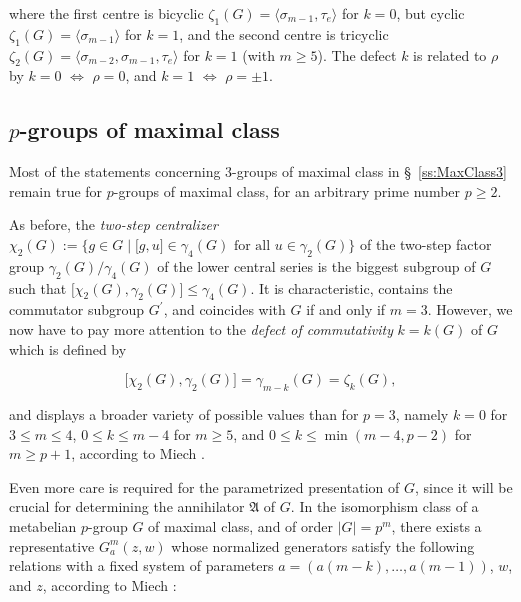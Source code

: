 \documentclass{amsart}
\theoremstyle{definition}
\numberwithin{equation}{section}
\begin{document}
\begin{itemize}
\noindent
where the first centre is bicyclic \(\zeta_1(G)=\langle\sigma_{m-1},\tau_e\rangle\) for \(k=0\),
but cyclic \(\zeta_1(G)=\langle\sigma_{m-1}\rangle\) for \(k=1\),
and the second centre is tricyclic \(\zeta_2(G)=\langle\sigma_{m-2},\sigma_{m-1},\tau_e\rangle\) for \(k=1\) (with \(m\ge 5\)).
The defect \(k\) is related to \(\rho\) by
\(k=0\) \(\Longleftrightarrow\) \(\rho=0\), and
\(k=1\) \(\Longleftrightarrow\) \(\rho=\pm 1\).

\end{itemize}



\subsection{\(p\)-groups of maximal class}
\label{ss:MaxClassP}

\noindent
Most of the statements concerning \(3\)-groups of maximal class in \S\
\ref{ss:MaxClass3}
remain true for \(p\)-groups of maximal class, 
for an arbitrary prime number \(p\ge 2\).

As before, the \textit{two-step centralizer}
\(\chi_2(G):=\lbrace g\in G\mid\lbrack g,u\rbrack\in\gamma_4(G)\text{ for all }u\in\gamma_2(G)\rbrace\)
of the two-step factor group \(\gamma_2(G)/\gamma_4(G)\) of the lower central series 
is the biggest subgroup of \(G\) such that
\(\lbrack\chi_2(G),\gamma_2(G)\rbrack\le\gamma_4(G)\).
It is characteristic, contains the commutator subgroup \(G^\prime\), and
coincides with \(G\) if and only if \(m=3\).
However, we now have to pay more attention to the \textit{defect of commutativity} \(k=k(G)\) of \(G\)
which is defined by

\begin{equation}
\label{eqn:DefectMaxP}
\lbrack\chi_2(G),\gamma_2(G)\rbrack=\gamma_{m-k}(G)=\zeta_k(G),
\end{equation}

\noindent
and displays a broader variety of possible values than for \(p=3\), namely
\(k=0\) for \(3\le m\le 4\), \(0\le k\le m-4\) for \(m\ge 5\),
and \(0\le k\le\min(m-4,p-2)\) for \(m\ge p+1\),
according to Miech
\cite[p. 331]{Mi1}.

Even more care is required for the parametrized presentation of \(G\),
since it will be crucial for determining the annihilator \(\mathfrak{A}\) of \(G\).
In the isomorphism class of a metabelian \(p\)-group \(G\) of maximal class,
and of order \(\lvert G\rvert=p^m\),
there exists a representative  \(G_a^{m}(z,w)\)
whose normalized generators satisfy the following relations
with a fixed system of parameters
\(a=(a(m-k),\ldots,a(m-1))\), \(w\), and \(z\),
according to Miech
\cite[p. 332]{Mi1}:
\end{document}
